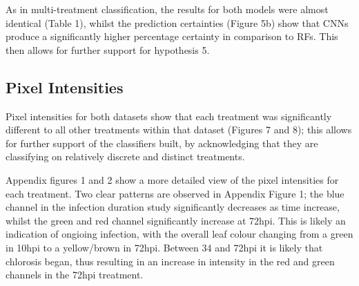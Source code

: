 \documentclass[../../Paper.tex]{subfiles}
\begin{document}
As in multi-treatment classification, the results for both models were almost identical (Table 1), whilst the prediction certainties (Figure 5b) show that CNNs produce a significantly higher percentage certainty in comparison to RFs. This then allows for further support for hypothesis 5. 


\subsection*{Pixel Intensities}

Pixel intensities for both datasets show that each treatment was significantly different to all other treatments within that dataset (Figures 7 and 8); this allows for further support of the classifiers built, by acknowledging that they are classifying on relatively discrete and distinct treatments.

Appendix figures 1 and 2 show a more detailed view of the pixel intensities for each treatment. Two clear patterns are observed in Appendix Figure 1; the blue channel in the infection duration study significantly decreases as time increase, whilst the green and red channel significantly increase at 72hpi. This is likely an indication of ongioing infection, with the overall leaf colour changing from a green in 10hpi to a yellow/brown in 72hpi. Between 34 and 72hpi it is likely that chlorosis began, thus resulting in an increase in intensity in the red and green channels in the 72hpi treatment. 
\end{document}
